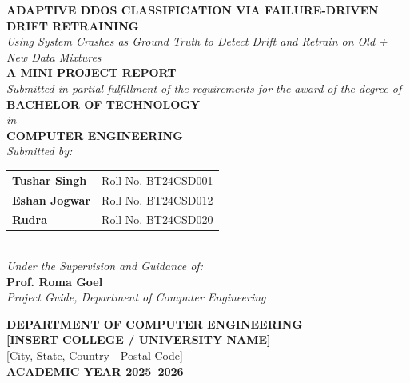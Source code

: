 \documentclass[12pt,a4paper,oneside]{report}
\begin{document}

\begin{titlepage}
\begin{center}

\vspace*{0.5cm}
{\LARGE \textbf{ADAPTIVE DDOS CLASSIFICATION VIA FAILURE-DRIVEN DRIFT RETRAINING}}\\[0.4cm]
{\Large \textit{Using System Crashes as Ground Truth to Detect Drift and Retrain on Old + New Data Mixtures}}\\[1.2cm]

{\large \textbf{A MINI PROJECT REPORT}}\\[0.3cm]
\textit{Submitted in partial fulfillment of the requirements for the award of the degree of}\\[0.3cm]
{\large \textbf{BACHELOR OF TECHNOLOGY}}\\[0.2cm]
\textit{in}\\[0.2cm]
{\large \textbf{COMPUTER ENGINEERING}}\\[1.2cm]

\textit{Submitted by:}\\[0.3cm]
\begin{tabular}{ll}
\textbf{Tushar Singh} & \quad Roll No. BT24CSD001 \\
\textbf{Eshan Jogwar} & \quad Roll No. BT24CSD012 \\
\textbf{Rudra}        & \quad Roll No. BT24CSD020 \\
\end{tabular}\\[1.4cm]

\textit{Under the Supervision and Guidance of:}\\[0.3cm]
{\large \textbf{Prof. Roma Goel}}\\[0.2cm]
\textit{Project Guide, Department of Computer Engineering}\\[1.2cm]

\vfill

{\Large \textbf{DEPARTMENT OF COMPUTER ENGINEERING}}\\[0.2cm]
{\large \textbf{[INSERT COLLEGE / UNIVERSITY NAME]}}\\[0.2cm]
{\normalsize [City, State, Country - Postal Code]}\\[0.4cm]
{\large \textbf{ACADEMIC YEAR 2025--2026}}

\end{center}
\end{titlepage}
\end{document}
